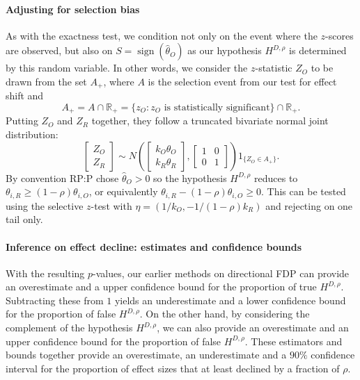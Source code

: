 \documentclass[aoas, preprint]{imsart}
\theoremstyle{definition}
\theoremstyle{custom}
\newcommand{\RR}{\mathbb{R}}
\DeclareMathOperator{\sgn}{sign}
\newcommand{\htheta}{\hat{\theta}}
\begin{document}
  \paragraph{Adjusting for selection bias} As with the exactness test, we condition not only on the event where the $z$-scores are observed, but also on $S = \sgn(\htheta_O)$ as our hypothesis $H^{D,\rho}$ is determined by this random variable. In other words, we consider the $z$-statistic $Z_O$ to be drawn from the set $A_+$, where $A$ is the selection event from our test for effect shift and
  \[
    A_+ = A \cap \RR_+ = \{z_O: z_O \text{ is statistically significant}\} \cap \RR_+.
  \]
  Putting $Z_O$ and $Z_R$ together, they follow a truncated bivariate normal joint distribution:
  \[
    \begin{bmatrix}
      Z_O \\ Z_R
    \end{bmatrix} \sim N\left(\begin{bmatrix}
      k_O \theta_O \\ k_R \theta_R
    \end{bmatrix}, \begin{bmatrix}
      1 & 0 \\ 0 & 1
    \end{bmatrix}\right) 1_{\{Z_O \in A_+\}}.
  \]
  By convention RP:P chose $\htheta_O > 0$ so the hypothesis $H^{D,\rho}$ reduces to $\theta_{i,R} \ge (1-\rho) \theta_{i,O}$, or equivalently $\theta_{i,R} - (1-\rho) \theta_{i,O} \ge 0$. This can be tested using the selective $z$-test with $\eta = (1/k_O, -1/(1-\rho)k_R)$ and rejecting on one tail only.

  \paragraph{Inference on effect decline: estimates and confidence bounds} With the resulting $p$-values, our earlier methods on directional FDP can provide an overestimate and a upper confidence bound for the proportion of true $H^{D,\rho}$. Subtracting these from $1$ yields an underestimate and a lower confidence bound for the proportion of false $H^{D,\rho}$. On the other hand, by considering the complement of the hypothesis $H^{D,\rho}$, we can also provide an overestimate and an upper confidence bound for the proportion of false $H^{D,\rho}$. These estimators and bounds together provide an overestimate, an underestimate and a $90\%$ confidence interval for the proportion of effect sizes that at least declined by a fraction of $\rho$.
\end{document}

